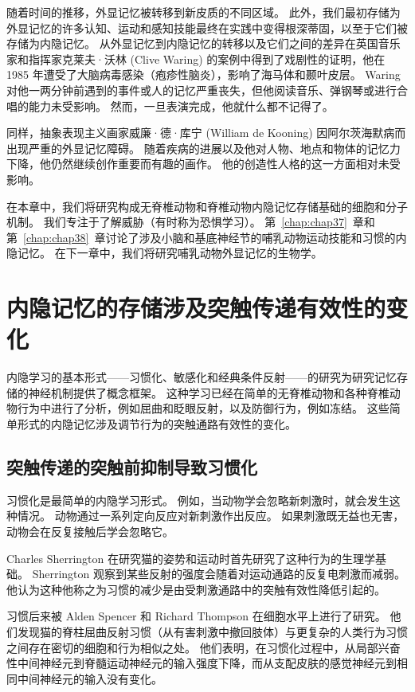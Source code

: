 随着时间的推移，外显记忆被转移到新皮质的不同区域。
此外，我们最初存储为外显记忆的许多认知、运动和感知技能最终在实践中变得根深蒂固，以至于它们被存储为内隐记忆。
从外显记忆到内隐记忆的转移以及它们之间的差异在英国音乐家和指挥家克莱夫·沃林 (Clive Waring) 的案例中得到了戏剧性的证明，他在 1985 年遭受了大脑病毒感染（疱疹性脑炎），影响了海马体和颞叶皮层。
Waring 对他一两分钟前遇到的事件或人的记忆严重丧失，但他阅读音乐、弹钢琴或进行合唱的能力未受影响。
然而，一旦表演完成，他就什么都不记得了。


同样，抽象表现主义画家威廉·德·库宁 (William de Kooning) 因阿尔茨海默病而出现严重的外显记忆障碍。
随着疾病的进展以及他对人物、地点和物体的记忆力下降，他仍然继续创作重要而有趣的画作。
他的创造性人格的这一方面相对未受影响。


在本章中，我们将研究构成无脊椎动物和脊椎动物内隐记忆存储基础的细胞和分子机制。
我们专注于了解威胁（有时称为恐惧学习）。
第~\ref{chap:chap37}~章和第~\ref{chap:chap38}~章讨论了涉及小脑和基底神经节的哺乳动物运动技能和习惯的内隐记忆。
在下一章中，我们将研究哺乳动物外显记忆的生物学。



\section{内隐记忆的存储涉及突触传递有效性的变化}

内隐学习的基本形式——习惯化、敏感化和经典条件反射——的研究为研究记忆存储的神经机制提供了概念框架。
这种学习已经在简单的无脊椎动物和各种脊椎动物行为中进行了分析，例如屈曲和眨眼反射，以及防御行为，例如冻结。
这些简单形式的内隐记忆涉及调节行为的突触通路有效性的变化。



\subsection{突触传递的突触前抑制导致习惯化}

习惯化是最简单的内隐学习形式。
例如，当动物学会忽略新刺激时，就会发生这种情况。
动物通过一系列定向反应对新刺激作出反应。
如果刺激既无益也无害，动物会在反复接触后学会忽略它。


Charles Sherrington 在研究猫的姿势和运动时首先研究了这种行为的生理学基础。
Sherrington 观察到某些反射的强度会随着对运动通路的反复电刺激而减弱。
他认为这种他称之为习惯的减少是由受刺激通路中的突触有效性降低引起的。


习惯后来被 Alden Spencer 和 Richard Thompson 在细胞水平上进行了研究。
他们发现猫的脊柱屈曲反射习惯（从有害刺激中撤回肢体）与更复杂的人类行为习惯之间存在密切的细胞和行为相似之处。
他们表明，在习惯化过程中，从局部兴奋性中间神经元到脊髓运动神经元的输入强度下降，而从支配皮肤的感觉神经元到相同中间神经元的输入没有变化。


